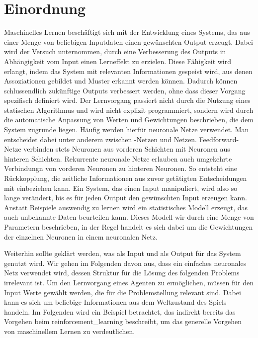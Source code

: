 \section{Einordnung}
Maschinelles Lernen beschäftigt sich mit der Entwicklung eines Systems, das aus einer Menge von beliebigen Inputdaten einen gewünschten Output erzeugt. Dabei wird der Versuch unternommen, durch eine Verbesserung des Outputs in Abhängigkeit vom Input einen Lerneffekt zu erzielen. Diese Fähigkeit wird erlangt, indem das System mit relevanten Informationen gespeist wird, aus denen Assoziationen gebildet und Muster erkannt werden können. Dadurch können schlussendlich zukünftige Outputs verbessert werden, ohne dass dieser Vorgang spezifisch definiert wird. Der Lernvorgang passiert nicht durch die Nutzung eines statischen Algorithmus und wird nicht explizit programmiert, sondern wird durch die automatische Anpassung von Werten und Gewichtungen beschrieben, die dem System zugrunde liegen. Häufig werden hierfür neuronale Netze verwendet. Man entscheidet dabei unter anderem zwischen -Netzen und  Netzen. Feedforward-Netze verbinden stets Neuronen aus vorderen Schichten mit Neuronen aus hinteren Schichten. Rekurrente neuronale Netze erlauben auch umgekehrte Verbindungn von vorderen Neuronen zu hinteren Neuronen. So entsteht eine Rückkopplung, die zeitliche Informationen aus zuvor getätigten Entscheidungen mit einbeziehen kann.
Ein System, das einen Input manipuliert, wird also so lange verändert, bis es für jeden Output den gewünschten Input erzeugen kann. Anstatt Beispiele auswendig zu lernen wird ein statistisches Modell erzeugt, das auch unbekannte Daten beurteilen kann. Dieses Modell wir durch eine Menge von Parametern beschrieben, in der Regel handelt es sich dabei um die Gewichtungen der einzelnen Neuronen in einem neuronalen Netz.

Weiterhin sollte geklärt werden, was als Input und als Output für das System genutzt wird. Wir gehen im Folgenden davon aus, dass ein einfaches neuronales Netz verwendet wird, dessen Struktur für die Lösung des folgenden Problems irrelevant ist. Um den Lernvorgang eines Agenten zu ermöglichen, müssen für den Input Werte gewählt werden, die für die Problemstellung relevant sind. Dabei kann es sich um beliebige Informationen aus dem Weltzustand des Spiels handeln. Im Folgenden wird ein Beispiel betrachtet, das indirekt bereits das Vorgehen beim \ac{reinforcement_learning} beschreibt, um das generelle Vorgehen von maschinellem Lernen zu verdeutlichen.

